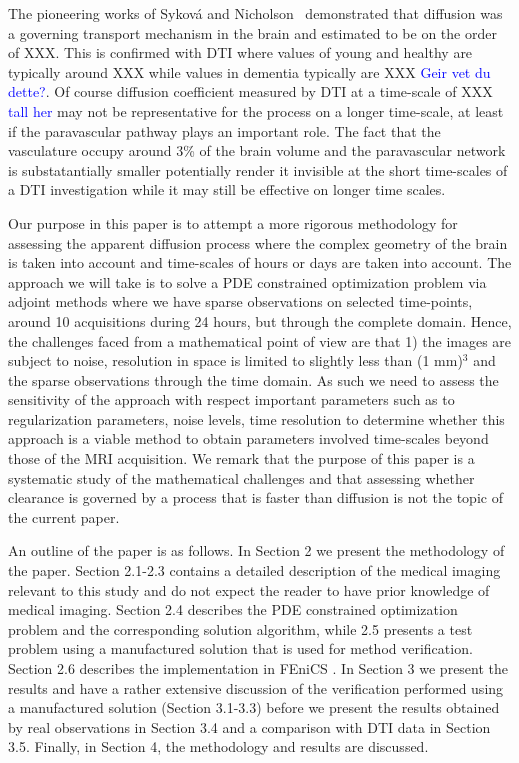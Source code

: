 \documentclass[11pt,a4paper]{article}
\newcommand{\kam}[1]{\textcolor{blue}{#1}}
\begin{document}
The pioneering works of Sykov{\'a} and Nicholson~\cite{sykova2008diffusion} demonstrated
that diffusion was a governing transport mechanism in the brain and estimated to be on the order
of XXX. This is confirmed with DTI where values of young and healthy are typically around XXX
while values in dementia typically are XXX \kam{Geir vet du dette?}. Of course diffusion coefficient 
measured by DTI at a time-scale of XXX \kam{tall her} may not be representative for the process on a
longer time-scale, at least if the paravascular pathway plays an important role. The fact that the vasculature  occupy around 3\% of the brain volume 
and the paravascular network is substatantially smaller potentially render it invisible at the short time-scales of a DTI investigation 
while it may still be effective on longer time scales.   


Our purpose in this paper is to attempt a more rigorous methodology 
for assessing the apparent diffusion process where
the complex geometry of the brain is taken into account and time-scales of hours or days are taken into account. 
The approach we will take is to solve a PDE constrained optimization problem 
via adjoint methods where we have sparse observations on selected time-points, around 10 acquisitions during 24 hours, but through
the complete domain. Hence, the challenges faced from a mathematical point of view 
are that 1) the images are subject to noise, resolution in space is limited to slightly less than (1 mm)$^3$ and 
the sparse observations through the time domain.  As such we need to assess the sensitivity of
the approach with respect important parameters such as to regularization parameters, noise levels, 
time resolution to determine whether this approach is a viable method
to obtain parameters involved time-scales beyond those of the MRI acquisition. We remark that the purpose
of this paper is a systematic study of the mathematical challenges and that assessing  
whether clearance is governed by a process that is faster than diffusion is not the topic of the current paper.       

An outline of the paper is as follows. 
In Section 2 we present the methodology of the paper. Section 2.1-2.3 contains a detailed description of the medical imaging 
relevant to this study and do not expect the reader to have prior knowledge of medical imaging. Section 2.4
describes the PDE constrained optimization problem and the corresponding solution algorithm, while 2.5 presents
a test problem using a manufactured solution that is used for method verification. Section 2.6 describes the implementation 
in FEniCS \cite{LoggMardalEtAl2012a}. In Section 3 we present the results and have a rather extensive discussion of the verification performed
using a manufactured solution (Section 3.1-3.3) before we present the results obtained by real observations in Section 3.4     
and a comparison with DTI data in Section 3.5. Finally, in Section 4, the methodology and results are discussed.  
   
\end{document}
